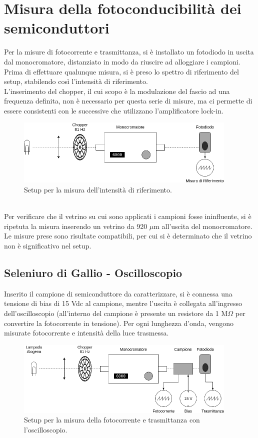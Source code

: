 \documentclass[11pt]{article} %
\begin{document}
\section{Misura della fotoconducibilità dei semiconduttori}
Per la misure di fotocorrente e trasmittanza, si è installato un fotodiodo in uscita dal monocromatore,  distanziato in modo da riuscire ad alloggiare i campioni. Prima di effettuare qualunque misura, si è preso lo spettro di riferimento del setup, stabilendo così l'intensità di riferimento.\\
L'inserimento del chopper, il cui scopo è la modulazione del fascio ad una frequenza definita, non è necessario per questa serie di misure, ma ci permette di essere consistenti con le successive che utilizzano l'amplificatore lock-in.
\begin{figure}[h!]
\begin{center}
\includegraphics[width=400px]{img/foto_rif.png}
\caption{Setup per la misura dell'intensità di riferimento.}
\end{center}
\end{figure}
\\Per verificare che il vetrino su cui sono applicati i campioni fosse ininfluente, si è ripetuta la misura inserendo un vetrino da 920 $\mu$m all'uscita del monocromatore. Le misure prese sono risultate compatibili, per cui si è determinato che il vetrino non è significativo nel setup.
\subsection{Seleniuro di Gallio - Oscilloscopio}
Inserito il campione di semiconduttore da caratterizzare, si è connessa una tensione di bias di 15 Vdc al campione, mentre l'uscita è collegata all'ingresso dell'oscilloscopio (all'interno del campione è presente un resistore da 1 M$\Omega$ per convertire la fotocorrente in tensione). Per ogni lunghezza d'onda, vengono misurate fotocorrente e intensità della luce trasmessa.
\begin{figure}[h!]
\begin{center}
\includegraphics[width=400px]{img/foto_osc.png}
\caption{Setup per la misura della fotocorrente e trasmittanza con l'oscilloscopio.}
\end{center}
\end{figure}
\end{document}
